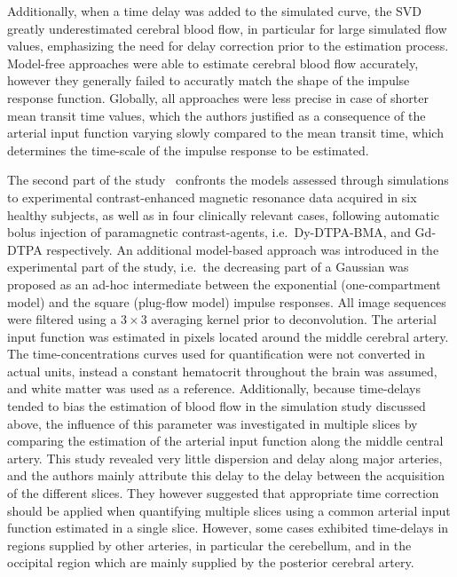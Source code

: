 Additionally, when a time delay was added to the simulated curve, the SVD greatly underestimated cerebral blood flow, in particular for large simulated flow values, emphasizing the need for delay correction prior to the estimation process.
Model-free approaches were able to estimate cerebral blood flow accurately, however they generally failed to accuratly match the shape of the impulse response function.
Globally, all approaches were less precise in case of shorter mean transit time values, which the authors justified as a consequence of the arterial input function varying slowly compared to the mean transit time, which determines the time-scale of the impulse response to be estimated.

The second part of the study~\cite{ostergaard:1996hh} confronts the models assessed through simulations to experimental contrast-enhanced magnetic resonance data acquired in six healthy subjects, as well as in four clinically relevant cases, following automatic bolus injection of paramagnetic contrast-agents, i.e.~Dy-DTPA-BMA, and Gd-DTPA respectively.
An additional model-based approach was introduced in the experimental part of the study, i.e.~the decreasing part of a Gaussian was proposed as an ad-hoc intermediate between the exponential (one-compartment model) and the square (plug-flow model) impulse responses. 
All image sequences were filtered using a $3 \times 3$ averaging kernel prior to deconvolution.
The arterial input function was estimated in pixels located around the middle cerebral artery.
The time-concentrations curves used for quantification were not converted in actual units, instead a constant hematocrit throughout the brain was assumed, and white matter was used as a reference.
Additionally, because time-delays tended to bias the estimation of blood flow in the simulation study discussed above, the influence of this parameter was investigated in multiple slices by comparing the estimation of the arterial input function along the middle central artery.
This study revealed very little dispersion and delay along major arteries, and the authors mainly attribute this delay to the delay between the acquisition of the different slices.
They however suggested that appropriate time correction should be applied when quantifying multiple slices using a common arterial input function estimated in a single slice.
However, some cases exhibited time-delays in regions supplied by other arteries, in particular the cerebellum, and in the occipital region which are mainly supplied by the posterior cerebral artery.
